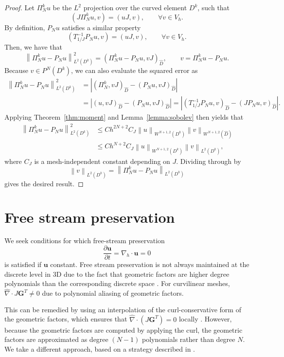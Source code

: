 \documentclass[preprint,10pt]{article}
\theoremstyle{definition}
\theoremstyle{lemma}
\theoremstyle{theorem}
\theoremstyle{assumption}
\renewcommand{\hat}{\widehat}
\newcommand{\pd}[2]{\frac{\partial#1}{\partial#2}}
\newcommand{\nor}[1]{\left\| #1 \right\|}
\newcommand{\LRp}[1]{\left( #1 \right)}
\newcommand{\LRb}[1]{\left| #1 \right|}
\newcommand{\Grad} {\ensuremath{\nabla}}
\begin{document}
\begin{proof}
Let $\Pi_N^k u$ be the $L^2$ projection over the curved element $D^k$, such that
\[
\LRp{J\Pi_N^k u,v} = \LRp{u J,v}, \qquad \forall v\in V_h.
\]
By definition, $P_N u$ satisfies a similar property
\[
\LRp{T_{1/J}^{-1} P_N u,v} = \LRp{u J,v}, \qquad \forall v\in V_h.
\]
Then, we have that
\[
\nor{\Pi_N^k  u - P_N u}_{L^2\LRp{D^k}}^2 = \LRp{\Pi_N^k  u - P_N u,vJ}_{\hat{D}}, \qquad v = \Pi_N^k  u - P_N u.
\]
Because $v \in P^N\LRp{D^k}$, we can also evaluate the squared error as
\begin{align*}
\nor{\Pi_N^k  u - P_N u}_{L^2\LRp{D^k}}^2 &= \LRb{\LRp{\Pi_N^k ,vJ}_{\hat{D}} - \LRp{P_N u,vJ}_{\hat{D}}}\\
& = \LRb{\LRp{u,vJ}_{\hat{D}} - \LRp{P_N u,vJ}_{\hat{D}}} = \LRb{\LRp{T_{1/J}^{-1}P_N u,v}_{\hat{D}} - \LRp{JP_N u,v}_{\hat{D}}}.
\end{align*}
Applying Theorem~\ref{thm:moment} and Lemma~\ref{lemma:sobolev} then yields that 
\begin{align*}
\nor{\Pi_N^k u - P_N u}_{L^2\LRp{D^k}}^2 &\leq Ch^{2N+2} C_J\nor{u}_{W^{N+1,2}\LRp{D^k}}
\nor{v}_{W^{N+1,2}\LRp{\hat{D}}} \\
&\leq Ch^{N+2} C_J\nor{u}_{W^{N+1,2}\LRp{D^k}}\nor{v}_{L^2\LRp{D^k}},
\end{align*}
where $C_J$ is a mesh-independent constant depending on $J$.  Dividing through by 
\[
\nor{v}_{L^2\LRp{D^k}} = \nor{\Pi^k_N u - P_N u}_{L^2\LRp{D^k}}
\]
 gives the desired result.  %
\end{proof}


\section{Free stream preservation}

We seek conditions for which free-stream preservation 
\[
\pd{\bm{u}}{t} = \Grad_h \cdot \bm{u} = 0
\]
is satisfied if $\bm{u}$ constant.  Free stream preservation is not always maintained at the discrete level in 3D due to the fact that geometric factors are higher degree polynomials than the corresponding discrete space \cite{kopriva2006metric, johnen2013geometrical}.  For curvilinear meshes, $\hat{\Grad}\cdot{J\bm{G}^T} \neq 0$ due to polynomial aliasing of geometric factors.  

This can be remedied by using an interpolation of the curl-conservative form of the geometric factors, which ensures that $\hat{\Grad}\cdot\LRp{J\bm{G}^T} = 0$ locally \cite{visbal2002use, kopriva2006metric}.  However, because the geometric factors are computed by applying the curl, the geometric factors are approximated as degree $(N-1)$ polynomials rather than degree $N$.  We take a different approach, based on a strategy described in \cite{fernandez2016simultaneous}.  
\end{document}

